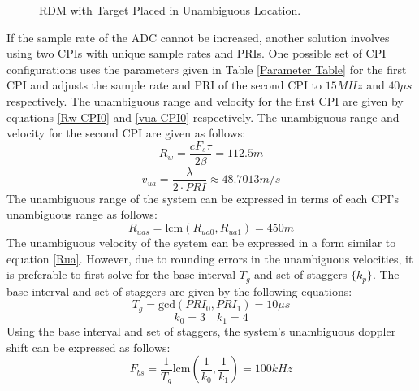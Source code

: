 \documentclass[conference]{IEEEtran}
\begin{document}
\begin{figure}[H]
\centerline{}
\caption{RDM with Target Placed in Unambiguous Location.}
\label{rdm_unambiguous_target}
\end{figure}
If the sample rate of the ADC cannot be increased, another solution involves using two CPIs with unique sample rates and PRIs. One possible set of CPI configurations uses the parameters given in Table \ref{Parameter Table} for the first CPI and adjusts the sample rate and PRI of the second CPI to $15MHz$ and $40\mu s$ respectively. The unambiguous range and velocity for the first CPI are given by equations \ref{Rw CPI0} and \ref{vua CPI0} respectively. The unambiguous range and velocity for the second CPI are given as follows:
\begin{equation}
R_w = \frac{c F_s \tau}{2\beta} = 112.5m
\end{equation}
\begin{equation}
v_{ua} = \frac{\lambda}{2\cdot PRI} \approx 48.7013 m/s
\end{equation}
The unambiguous range of the system can be expressed in terms of each CPI's unambiguous range as follows:
\begin{equation}
\label{Rua}
R_{uas} = \text{lcm}(R_{ua0}, R_{ua1}) = 450m
\end{equation}
The unambiguous velocity of the system can be expressed in a form similar to equation \ref{Rua}. However, due to rounding errors in the unambiguous velocities, it is preferable to first solve for the base interval $T_g$ and set of staggers $\{k_p\}$. The base interval and set of staggers are given by the following equations:
\begin{equation}
T_g = \text{gcd}(PRI_0,PRI_1) = 10\mu s
\end{equation}
\begin{equation}
k_0 = 3 \quad k_1 = 4
\end{equation}
Using the base interval and set of staggers, the system's unambiguous doppler shift can be expressed as follows:
\begin{equation}
F_{bs} = \frac{1}{T_g}\text{lcm}\left(\frac{1}{k_0},\frac{1}{k_1}\right) = 100kHz
\end{equation}
\end{document}
